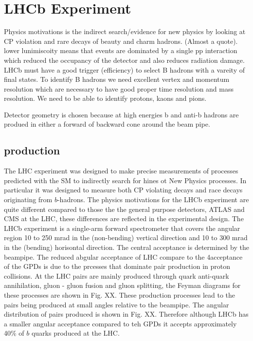 \section{LHCb Experiment}


Physics motivations is the indirect search/evidence for new physics by looking at CP violation and rare decays of beauty and charm hadrons. (Almost a quote).
lower lunimiscoity  means that events are dominated by a single pp interaction which reduced the occupancy of the detector and also reduces radiation damage.
LHCb must have a good trigger (efficiency) to select B hadrons with a vareity of final states. To identify B hadrons we need excellent vertex and momentum resolution which are necessary to have good proper time resolution and mass resolution. We need to be able to identify protons, kaons and pions. 

Detector geometry is chosen because at high energies b and anti-b hadrons are produed in either a forward of backward cone around the beam pipe.

\subsection{\bbbar production}
The LHC experiment was designed to make precise measurements of processes predicted with the SM to indirectly search for hines ot New Physics processes. %
In particular it was designed to measure both CP violating decays and race decays originating from $b$-hadrons. The physics motivations for the LHCb experiment are quite different compared to those the the general purpose detectors, ATLAS and CMS at the LHC, these differences are reflected in the experimental design. The LHCb experiment is a single-arm forward spectrometer that covers the angular region 10 to 250 mrad in the (non-bending) vertical direction and 10 to 300 mrad in the (bending) horisontal direction. The central acceptance is determined by the beampipe. The reduced abgular acceptance of LHC compare to the 4\pi acceptance of the GPDs is due to the prcesses that dominate \bbbar pair production in proton collisions. At the LHC \bbbar pairs are mainly produced through quark anti-quark annihilation, gluon - gluon fusion and gluon splitting, the Feyman diagrams for these processes are shown in Fig. XX. %
These production processes lead to the \bbbar pairs being produced at small angles relative to the beampipe. The angular distribution of \bbbar pairs produced is shown in Fig. XX. Therefore although LHCb has a smaller angular acceptance compared to teh GPDs it accepts approximately 40\% of $b$ quarks produced at the LHC.


